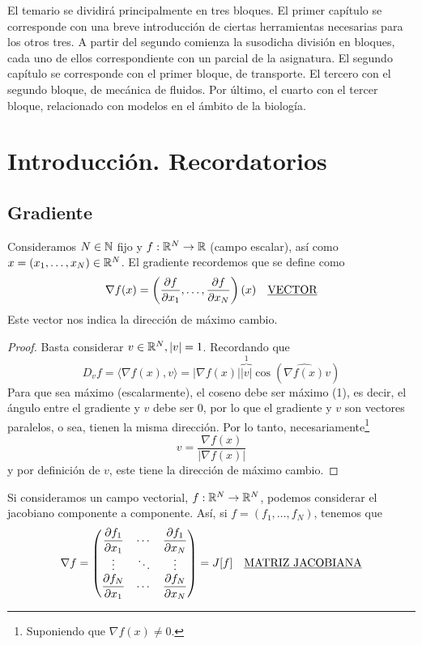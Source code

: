 \noindent
El temario se dividirá principalmente en tres bloques. El primer capítulo se corresponde con una breve introducción de ciertas herramientas necesarias para los otros tres. A partir del segundo comienza la susodicha división en bloques, cada uno de ellos correspondiente con un parcial de la asignatura.
El segundo capítulo se corresponde con el primer bloque, de transporte. El tercero con el segundo bloque, de mecánica de fluidos. Por último, el cuarto con el tercer bloque, relacionado con modelos en el ámbito de la biología.\newpage

\chapter{Introducción. Recordatorios}
\noindent

\section{Gradiente}

Consideramos $N \in \mathbb{N}$ fijo y $f : \mathbb{R}^N \to \mathbb{R}$ (campo escalar), así como $x = (x_1, \ldots, x_N) \in \mathbb{R}^N$. El gradiente 
recordemos que se define como $$\nabla f (x) = \left( \dfrac{\partial f}{\partial x_1}, \ldots, 
\dfrac{\partial f}{\partial x_N} \right)(x) \quad \text{\underline{VECTOR}}$$
Este vector nos indica la dirección de máximo cambio.

\begin{proof}
    Basta considerar $v \in \mathbb{R}^N, |v| = 1$. Recordando que $$D_vf = \langle \nabla f(x), v \rangle = |\nabla f(x)| 
    \overbrace{|v|}^{1} \cos(\widehat{\nabla f(x)}{v})$$
    Para que sea máximo (escalarmente), el coseno debe ser máximo (1), es decir, el ángulo entre el gradiente y 
    $v$ debe ser 0, por lo que el gradiente y $v$ son vectores paralelos, o sea, tienen la misma dirección.
    Por lo tanto, necesariamente\footnote{Suponiendo que $\nabla f(x) \neq 0$.}
    $$v = \dfrac{\nabla f(x)}{|\nabla f(x)|}$$
    y por definición de $v$, este tiene la dirección de máximo cambio.
\end{proof}

    Si consideramos un campo vectorial, $f: \mathbb{R}^N \to \mathbb{R}^N$, podemos considerar el jacobiano componente a componente. Así, si
    $f = (f_1, \ldots, f_N)$, tenemos que 
    $$\nabla f = \begin{pmatrix} 
        \dfrac{\partial f_1}{\partial x_1} & \cdots & \dfrac{\partial f_1}{\partial x_N} \\ 
        \vdots & \ddots & \vdots \\ 
        \dfrac{\partial f_N}{\partial x_1} & \cdots & \dfrac{\partial f_N}{\partial x_N} 
    \end{pmatrix} = J[f] \quad \text{\underline{MATRIZ JACOBIANA}}$$ 

